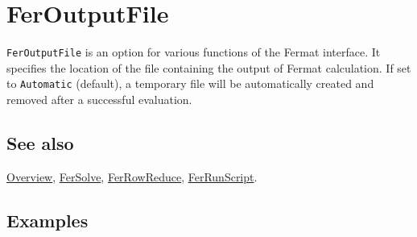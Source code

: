\documentclass[../FeynHelpersManual.tex]{subfiles}
\begin{document}
\hypertarget{feroutputfile}{
\section{FerOutputFile}\label{feroutputfile}}

\texttt{FerOutputFile} is an option for various functions of the Fermat
interface. It specifies the location of the file containing the output
of Fermat calculation. If set to \texttt{Automatic} (default), a
temporary file will be automatically created and removed after a
successful evaluation.

\subsection{See also}

\hyperlink{toc}{Overview}, \hyperlink{fersolve}{FerSolve},
\hyperlink{ferrowreduce}{FerRowReduce},
\hyperlink{ferrunscript}{FerRunScript}.

\subsection{Examples}
\end{document}
